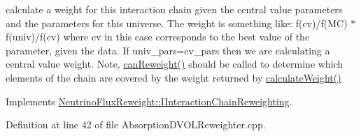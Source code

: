 calculate a weight for this interaction chain given the central value parameters and the parameters for this universe. The weight is something like\-: f(cv)/f(M\-C) $\ast$ f(univ)/f(cv) where cv in this case corresponds to the best value of the parameter, given the data. If univ\-\_\-pars=cv\-\_\-pars then we are calculating a central value weight. Note, \hyperlink{class_neutrino_flux_reweight_1_1_absorption_d_v_o_l_reweighter_a4431fee76a4b04a42dac9f6be83f6346}{can\-Reweight()} should be called to determine which elements of the chain are covered by the weight returned by \hyperlink{class_neutrino_flux_reweight_1_1_absorption_d_v_o_l_reweighter_abe4d5b881334283ded041e46d2613608}{calculate\-Weight()} 



Implements \hyperlink{class_neutrino_flux_reweight_1_1_i_interaction_chain_reweighting_ae28403553637013fdc720674ee24c7c5}{Neutrino\-Flux\-Reweight\-::\-I\-Interaction\-Chain\-Reweighting}.



Definition at line 42 of file Absorption\-D\-V\-O\-L\-Reweighter.\-cpp.


